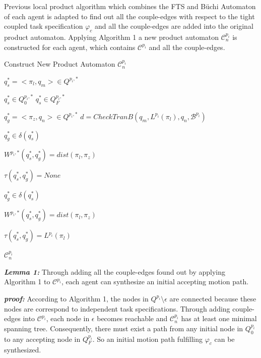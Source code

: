 \documentclass[journal]{IEEEtran}
\begin{document}
Previous local product algorithm \cite{baier2008principles} which combines the FTS and B\"{u}chi Automaton of each agent is adapted to find out all the couple-edges with respect to the tight coupled task specification $\varphi_c$ and all the couple-edges are added into the original product automaton. Applying Algorithm 1 a new product automaton $\mathcal{C}^{p_i}_n$ is constructed for each agent, which contains $\mathcal{C}^{p_i}$ and all the couple-edges.\par
\begin{algorithm}
  \caption{Construct New Product Automaton $\mathcal{C}^{p_i}_n$}
  {
    $q^{\ast}_s=<\pi_l,q_m>\in Q^{p_i,\ast}$

    {
        $q^{\ast}_s\in Q^{p_i,\ast}_0$
    }
    {
        $q^{\ast}_s\in Q^{p_i,\ast}_F$
    }
    {
        $q^{\ast}_g=<\pi_z,q_n>\in Q^{p_i,\ast}$
        $d = CheckTranB(q_m,L^{p_i}(\pi_l),q_n,\mathcal{B}^{p_i})$

        {
            $q^{\ast}_g\in \delta(q^{\ast}_s)$

            $W^{p_i,\ast}(q^{\ast}_s,q^{\ast}_g)=dist(\pi_l,\pi_z)$

            $\tau(q^{\ast}_s,q^{\ast}_g) = None$
        }
        \Else
        {
            {
                $q^{\ast}_g\in \delta(q^{\ast}_s)$

                $W^{p_i,\ast}(q^{\ast}_s,q^{\ast}_g)=dist(\pi_l,\pi_z)$

                $\tau(q^{\ast}_s,q^{\ast}_g)=L^{p_i}(\pi_l)$
            }
        }
    }
  }
  \Return $\mathcal{C}^{p_i}_n$
\end{algorithm}

\textbf{\emph{Lemma 1:}} Through adding all the couple-edges found out by applying Algorithm 1 to $\mathcal{C}^{p_i}$, each agent can synthesize an initial accepting motion path.\par
\textbf{\emph{proof:}} According to Algorithm 1, the nodes in $Q^{p_i} \setminus \epsilon$ are connected because these nodes are correspond to independent task specifications. Through adding couple-edges into $\mathcal{C}^{p_i}$, each node in $\epsilon$ becomes reachable and $\mathcal{C}^{p_i}_n$ has at least one minimal spanning tree. Consequently, there must exist a path from any initial node in $Q_0^{p_i}$ to any accepting node in $Q_F^{p_i}$. So an initial motion path fulfilling $\varphi_c$ can be synthesized.
\end{document}
